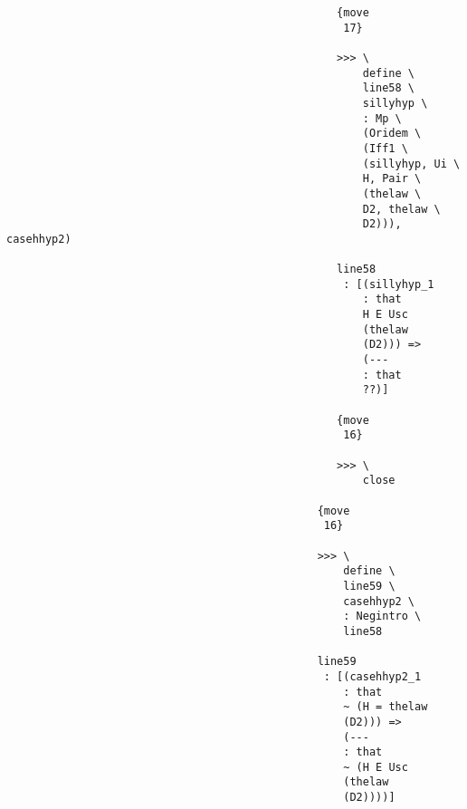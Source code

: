 \documentclass[12pt]{article}
\begin{document}
\begin{verbatim}
                                                   {move 
                                                    17}

                                                   >>> \
                                                       define \
                                                       line58 \
                                                       sillyhyp \
                                                       : Mp \
                                                       (Oridem \
                                                       (Iff1 \
                                                       (sillyhyp, Ui \
                                                       H, Pair \
                                                       (thelaw \
                                                       D2, thelaw \
                                                       D2))), casehhyp2)

                                                   line58 
                                                    : [(sillyhyp_1 
                                                       : that 
                                                       H E Usc 
                                                       (thelaw 
                                                       (D2))) => 
                                                       (--- 
                                                       : that 
                                                       ??)]

                                                   {move 
                                                    16}

                                                   >>> \
                                                       close

                                                {move 
                                                 16}

                                                >>> \
                                                    define \
                                                    line59 \
                                                    casehhyp2 \
                                                    : Negintro \
                                                    line58

                                                line59 
                                                 : [(casehhyp2_1 
                                                    : that 
                                                    ~ (H = thelaw 
                                                    (D2))) => 
                                                    (--- 
                                                    : that 
                                                    ~ (H E Usc 
                                                    (thelaw 
                                                    (D2))))]


\end{verbatim}
\end{document}

